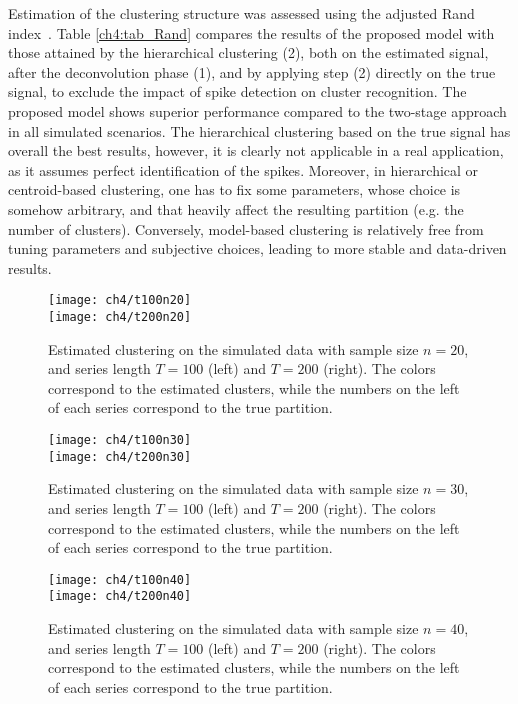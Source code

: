 Estimation of the clustering structure was assessed using the adjusted Rand index~\parencite{rand1971,hubert1985}. Table \ref{ch4:tab_Rand} compares the results of the proposed model with those attained by the hierarchical clustering (2), both on the estimated signal, after the deconvolution phase (1), and by applying step (2) directly on the true signal, to exclude the impact of spike detection on cluster recognition. The proposed model shows superior performance compared to the two-stage approach in all simulated scenarios. The hierarchical clustering based on the true signal has overall the best results, however, it is clearly not applicable in a real application, as it assumes perfect identification of the spikes.
Moreover, in hierarchical or centroid-based clustering, one has to fix some parameters, whose choice is somehow arbitrary, and that heavily affect the resulting partition (e.g. the number of clusters). Conversely, model-based clustering is relatively free from tuning parameters and subjective choices, leading to more stable and data-driven results.







\begin{figure}
	\centering
	\texttt{[image: ch4/t100n20]}\\
	\texttt{[image: ch4/t200n20]}
	\label{ch4:fig_n20}
	\caption[Estimated clustering on the simulated data with sample size $n=20$.]{Estimated clustering on the simulated data with sample size $n=20$, and series length $T=100$ (left) and $T=200$ (right). The colors correspond to the estimated clusters, while the numbers on the left of each series correspond to the true partition.}
\end{figure}

\begin{figure}
	\centering
	\texttt{[image: ch4/t100n30]}\\
	\texttt{[image: ch4/t200n30]}
	\label{ch4:fig_n30}
	\caption[Estimated clustering on the simulated data with sample size $n=30$.]{Estimated clustering on the simulated data with sample size $n=30$, and series length $T=100$ (left) and $T=200$ (right). The colors correspond to the estimated clusters, while the numbers on the left of each series correspond to the true partition.}
\end{figure}

\begin{figure}
	\centering
	\texttt{[image: ch4/t100n40]}\\
	\texttt{[image: ch4/t200n40]}
	\label{ch4:fig_n40}
	\caption[Estimated clustering on the simulated data with sample size $n=40$.]{Estimated clustering on the simulated data with sample size $n=40$, and series length $T=100$ (left) and $T=200$ (right). The colors correspond to the estimated clusters, while the numbers on the left of each series correspond to the true partition.}
\end{figure}










